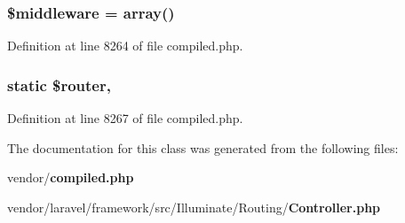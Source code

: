 \subsubsection[{\$middleware}]{\setlength{\rightskip}{0pt plus 5cm}\${\bf middleware} = array()\hspace{0.3cm}{\ttfamily [protected]}}\label{class_illuminate_1_1_routing_1_1_controller_a36a993ea76b635c84749f6e5e6562344}


Definition at line 8264 of file compiled.\+php.

\subsubsection[{\$router}]{\setlength{\rightskip}{0pt plus 5cm}static \$router\hspace{0.3cm}{\ttfamily [static]}, {\ttfamily [protected]}}\label{class_illuminate_1_1_routing_1_1_controller_adb231053477d6d6714cf76d4aeae3d19}


Definition at line 8267 of file compiled.\+php.



The documentation for this class was generated from the following files\+:\begin{DoxyCompactItemize}
\item 
vendor/{\bf compiled.\+php}\item 
vendor/laravel/framework/src/\+Illuminate/\+Routing/{\bf Controller.\+php}\end{DoxyCompactItemize}
